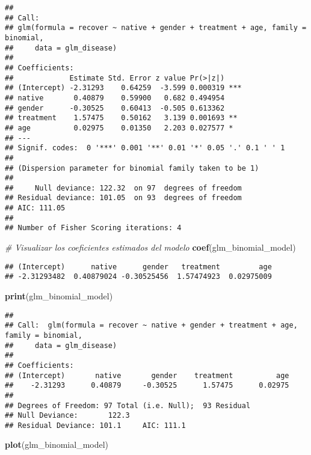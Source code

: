 \documentclass[
]{article}
\newenvironment{Shaded}{\begin{snugshade}}{\end{snugshade}}
\newcommand{\CommentTok}[1]{\textcolor[rgb]{0.56,0.35,0.01}{\textit{#1}}}
\newcommand{\FunctionTok}[1]{\textcolor[rgb]{0.13,0.29,0.53}{\textbf{#1}}}
\newcommand{\NormalTok}[1]{#1}
\begin{document}
\begin{verbatim}
## 
## Call:
## glm(formula = recover ~ native + gender + treatment + age, family = binomial, 
##     data = glm_disease)
## 
## Coefficients:
##             Estimate Std. Error z value Pr(>|z|)    
## (Intercept) -2.31293    0.64259  -3.599 0.000319 ***
## native       0.40879    0.59900   0.682 0.494954    
## gender      -0.30525    0.60413  -0.505 0.613362    
## treatment    1.57475    0.50162   3.139 0.001693 ** 
## age          0.02975    0.01350   2.203 0.027577 *  
## ---
## Signif. codes:  0 '***' 0.001 '**' 0.01 '*' 0.05 '.' 0.1 ' ' 1
## 
## (Dispersion parameter for binomial family taken to be 1)
## 
##     Null deviance: 122.32  on 97  degrees of freedom
## Residual deviance: 101.05  on 93  degrees of freedom
## AIC: 111.05
## 
## Number of Fisher Scoring iterations: 4
\end{verbatim}

\begin{Shaded}
\begin{Highlighting}[]
\CommentTok{\# Visualizar los coeficientes estimados del modelo}
\FunctionTok{coef}\NormalTok{(glm\_binomial\_model)}
\end{Highlighting}
\end{Shaded}

\begin{verbatim}
## (Intercept)      native      gender   treatment         age 
## -2.31293482  0.40879024 -0.30525456  1.57474923  0.02975009
\end{verbatim}

\begin{Shaded}
\begin{Highlighting}[]
\FunctionTok{print}\NormalTok{(glm\_binomial\_model)}
\end{Highlighting}
\end{Shaded}

\begin{verbatim}
## 
## Call:  glm(formula = recover ~ native + gender + treatment + age, family = binomial, 
##     data = glm_disease)
## 
## Coefficients:
## (Intercept)       native       gender    treatment          age  
##    -2.31293      0.40879     -0.30525      1.57475      0.02975  
## 
## Degrees of Freedom: 97 Total (i.e. Null);  93 Residual
## Null Deviance:       122.3 
## Residual Deviance: 101.1     AIC: 111.1
\end{verbatim}

\begin{Shaded}
\begin{Highlighting}[]
\FunctionTok{plot}\NormalTok{(glm\_binomial\_model)}
\end{Highlighting}
\end{Shaded}
\end{document}

